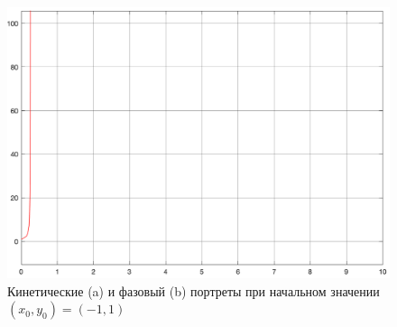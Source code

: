 \documentclass[11pt]{article}
\begin{document}
\begin{enumerate}
\begin{figure}[htbp!]
{\begin{minipage}[b]{.3\linewidth}
					\includegraphics[scale=0.1]{y_2_-11.png}
				\end{minipage}
			}
			\caption{Кинетические (a) и фазовый (b) портреты при начальном значении $(x_0,y_0)=(-1,1)$}
		\end{figure}
		\begin{figure}[htbp!]
			\centering
\end{figure}
\end{enumerate}
\end{document}

